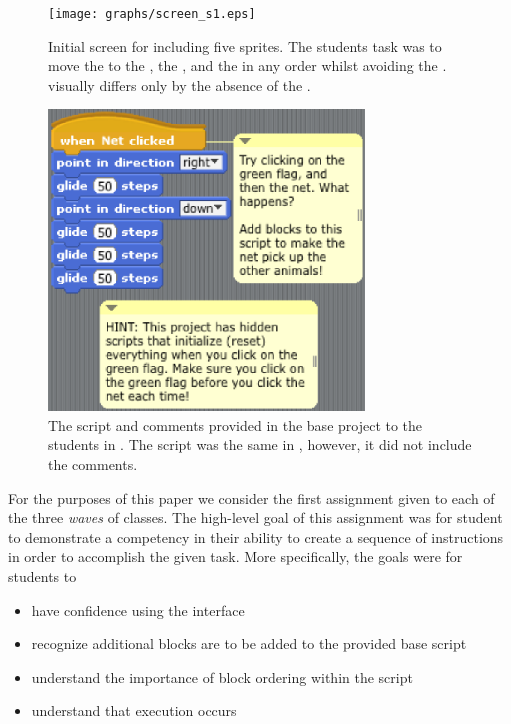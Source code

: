 \begin{figure}[!t]
\centering \texttt{[image: graphs/screen\_s1.eps]}
\caption{Initial screen for \sone{} including five sprites. The students task
  was to move the \net{} to \catch{} the \bear{}, the \horse{}, and the
  \zebra{} in any order whilst avoiding the \snake{}. \stwo{} visually differs
  only by the absence of the \snake{}.}
\end{figure}


\begin{figure}[!t]
\centering \includegraphics[width=3.3in]{graphs/screen_blocks.eps}
\caption{The script and comments provided in the base project to the students
  in \stwo{}. The script was the same in \sone{}, however, it did not include
  the comments.}
\end{figure}


For the purposes of this paper we consider the first assignment given to each
of the three \emph{waves} of classes. The high-level goal of this assignment
was for student to demonstrate a competency in their ability to create a
sequence of instructions in order to accomplish the given task. More
specifically, the goals were for students to

\begin{itemize}
\item have confidence using the interface
\item recognize additional blocks are to be added to the provided base script
\item understand the importance of block ordering within the script
\item understand that execution occurs \netclicked{}
\end{itemize}

